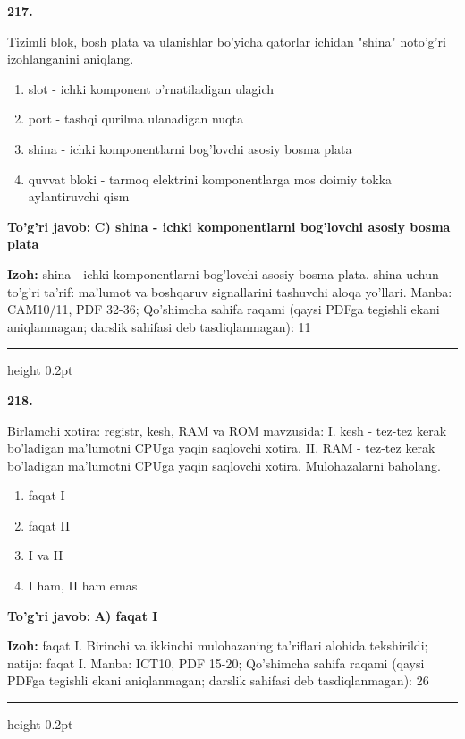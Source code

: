 \documentclass[10pt,a4paper]{article}
\begin{document}
{\bfseries\sffamily\color{ink} 217.}
\par
Tizimli blok, bosh plata va ulanishlar bo'yicha qatorlar ichidan "shina" noto'g'ri izohlanganini aniqlang.
\begin{enumerate}[label=\Alph*),leftmargin=9mm]
\item slot - ichki komponent o'rnatiladigan ulagich
\item port - tashqi qurilma ulanadigan nuqta
\item shina - ichki komponentlarni bog'lovchi asosiy bosma plata
\item quvvat bloki - tarmoq elektrini komponentlarga mos doimiy tokka aylantiruvchi qism
\end{enumerate}
\begin{tcolorbox}[enhanced,breakable,colback=teal!4,colframe=teal!60!black,boxrule=0.45pt,arc=1.2mm,left=2.7mm,right=2.7mm,top=1.8mm,bottom=1.8mm,before skip=2mm,after skip=2mm]
{\bfseries\sffamily\color{teal}To'g'ri javob:} \textbf{C) shina - ichki komponentlarni bog'lovchi asosiy bosma plata}
\par\smallskip
{\bfseries Izoh:} shina - ichki komponentlarni bog'lovchi asosiy bosma plata. shina uchun to'g'ri ta'rif: ma'lumot va boshqaruv signallarini tashuvchi aloqa yo'llari. Manba: CAM10/11, PDF 32-36; Qo'shimcha sahifa raqami (qaysi PDFga tegishli ekani aniqlanmagan; darslik sahifasi deb tasdiqlanmagan): 11
\end{tcolorbox}
\vspace{2mm}\hrule height 0.2pt\vspace{3mm}

{\bfseries\sffamily\color{ink} 218.}
\par
Birlamchi xotira: registr, kesh, RAM va ROM mavzusida: I. kesh - tez-tez kerak bo'ladigan ma'lumotni CPUga yaqin saqlovchi xotira. II. RAM - tez-tez kerak bo'ladigan ma'lumotni CPUga yaqin saqlovchi xotira. Mulohazalarni baholang.
\begin{enumerate}[label=\Alph*),leftmargin=9mm]
\item faqat I
\item faqat II
\item I va II
\item I ham, II ham emas
\end{enumerate}
\begin{tcolorbox}[enhanced,breakable,colback=teal!4,colframe=teal!60!black,boxrule=0.45pt,arc=1.2mm,left=2.7mm,right=2.7mm,top=1.8mm,bottom=1.8mm,before skip=2mm,after skip=2mm]
{\bfseries\sffamily\color{teal}To'g'ri javob:} \textbf{A) faqat I}
\par\smallskip
{\bfseries Izoh:} faqat I. Birinchi va ikkinchi mulohazaning ta'riflari alohida tekshirildi; natija: faqat I. Manba: ICT10, PDF 15-20; Qo'shimcha sahifa raqami (qaysi PDFga tegishli ekani aniqlanmagan; darslik sahifasi deb tasdiqlanmagan): 26
\end{tcolorbox}
\vspace{2mm}\hrule height 0.2pt\vspace{3mm}
\end{document}
